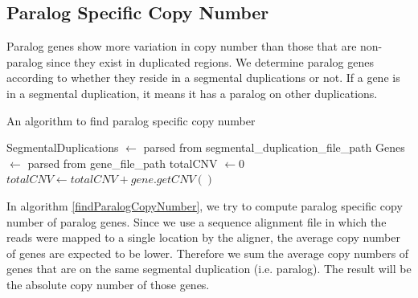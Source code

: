 \subsection{Paralog Specific Copy Number}
Paralog genes show more variation in copy number than those that are non-paralog since they exist in duplicated regions. We determine paralog genes according to whether they reside in a segmental duplications or not. If a gene is in a segmental duplication, it means it has a paralog on other duplications.

\begin{algorithm}
\caption{An algorithm to find paralog specific copy number}
\label{findParalogCopyNumber}
\begin{algorithmic}[1]
\State SegmentalDuplications $\gets$ parsed from segmental\_duplication\_file\_path
\State Genes $\gets$ parsed from gene\_file\_path
\State totalCNV $\gets 0$
\State $totalCNV \gets totalCNV + gene.getCNV()$
\EndIf
\EndFor
\EndFor
\EndProcedure
\end{algorithmic}
\end{algorithm}

In algorithm \ref{findParalogCopyNumber}, we try to compute paralog specific copy number of paralog genes. Since we use a sequence alignment file in which the reads were mapped to a single location by the aligner, the average copy number of genes are expected to be lower. Therefore we sum the average copy numbers of genes that are on the same segmental duplication (i.e. paralog). The result will be the absolute copy number of those genes.